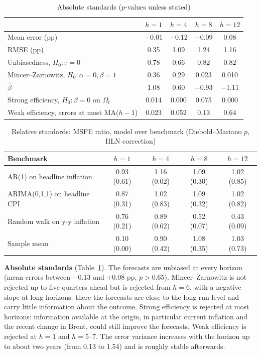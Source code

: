 \documentclass[11pt,a4paper]{article}
\begin{document}
\begin{table}[h]
  \centering\small
  \caption{Absolute standards ($p$-values unless stated)}\label{tab:absolute}
  \begin{tabular}{@{}lcccc@{}}
    \toprule
    & $h=1$ & $h=4$ & $h=8$ & $h=12$ \\
    \midrule
    Mean error (pp) & $-0.01$ & $-0.12$ & $-0.09$ & 0.08 \\
    RMSE (pp) & 0.35 & 1.09 & 1.24 & 1.16 \\
    Unbiasedness, $H_0: \tau = 0$ & 0.78 & 0.66 & 0.82 & 0.82 \\
    Mincer--Zarnowitz, $H_0: \alpha = 0, \beta = 1$ & 0.36 & 0.29 & 0.023 & 0.010 \\
    \quad $\hat\beta$ & 1.08 & 0.60 & $-0.93$ & $-1.11$ \\
    Strong efficiency, $H_0: \beta = 0$ on $\Omega_t$ & 0.014 & 0.000 & 0.075 & 0.000 \\
    Weak efficiency, errors at most MA($h-1$) & 0.023 & 0.052 & 0.13 & 0.64 \\
    \bottomrule
  \end{tabular}
\end{table}

\begin{table}[h]
  \centering\small
  \caption{Relative standards: MSFE ratio, model over benchmark (Diebold--Mariano $p$, HLN correction)}\label{tab:relative}
  \begin{tabular}{@{}lcccc@{}}
    \toprule
    Benchmark & $h=1$ & $h=4$ & $h=8$ & $h=12$ \\
    \midrule
    AR(1) on headline inflation   & 0.93 (0.61) & 1.16 (0.02) & 1.09 (0.30) & 1.02 (0.85) \\
    ARIMA(0,1,1) on headline CPI  & 0.87 (0.31) & 1.02 (0.83) & 1.09 (0.32) & 1.02 (0.82) \\
    Random walk on y-y inflation  & 0.76 (0.21) & 0.89 (0.62) & 0.52 (0.07) & 0.43 (0.09) \\
    Sample mean                   & 0.10 (0.00) & 0.90 (0.42) & 1.08 (0.35) & 1.03 (0.73) \\
    \bottomrule
  \end{tabular}
\end{table}

\textbf{Absolute standards} (Table~\ref{tab:absolute}). The forecasts are unbiased at every horizon
(mean errors between $-0.13$ and $+0.08$ pp, $p > 0.65$). Mincer--Zarnowitz is not rejected up to five
quarters ahead but is rejected from $h = 6$, with a negative slope at long horizons: there the
forecasts are close to the long-run level and carry little information about the outcome. Strong
efficiency is rejected at most horizons: information available at the origin, in particular current
inflation and the recent change in Brent, could still improve the forecasts. Weak efficiency is
rejected at $h = 1$ and $h = 5$--7. The error variance increases with the horizon up to about two
years (from 0.13 to 1.54) and is roughly stable afterwards.
\end{document}
